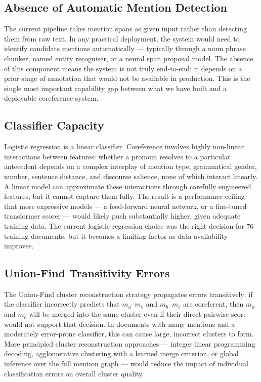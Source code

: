 \documentclass[12pt,a4paper]{report}
\begin{document}
\subsection{Absence of Automatic Mention Detection}

The current pipeline takes mention spans as given input rather than detecting them from raw text. In any practical deployment, the system would need to identify candidate mentions automatically --- typically through a noun phrase chunker, named entity recogniser, or a neural span proposal model. The absence of this component means the system is not truly end-to-end: it depends on a prior stage of annotation that would not be available in production. This is the single most important capability gap between what we have built and a deployable coreference system.

\subsection{Classifier Capacity}

Logistic regression is a linear classifier. Coreference involves highly non-linear interactions between features: whether a pronoun resolves to a particular antecedent depends on a complex interplay of mention type, grammatical gender, number, sentence distance, and discourse salience, none of which interact linearly. A linear model can approximate these interactions through carefully engineered features, but it cannot capture them fully. The result is a performance ceiling that more expressive models --- a feed-forward neural network, or a fine-tuned transformer scorer --- would likely push substantially higher, given adequate training data. The current logistic regression choice was the right decision for 76 training documents, but it becomes a limiting factor as data availability improves.

\subsection{Union-Find Transitivity Errors}

The Union-Find cluster reconstruction strategy propagates errors transitively: if the classifier incorrectly predicts that $m_a$--$m_b$ and $m_b$--$m_c$ are coreferent, then $m_a$ and $m_c$ will be merged into the same cluster even if their direct pairwise score would not support that decision. In documents with many mentions and a moderately error-prone classifier, this can cause large, incorrect clusters to form. More principled cluster reconstruction approaches --- integer linear programming decoding, agglomerative clustering with a learned merge criterion, or global inference over the full mention graph --- would reduce the impact of individual classification errors on overall cluster quality.
\end{document}
